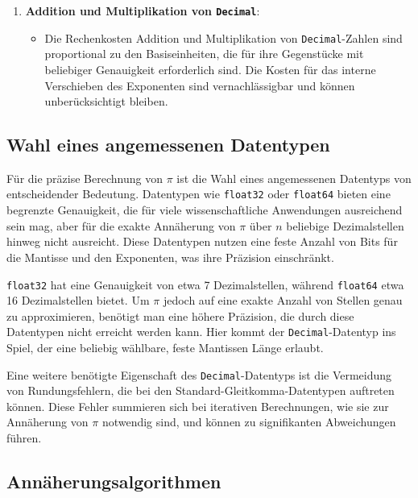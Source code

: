 \documentclass{scrartcl}
\theoremstyle{definition}
\newtheorem{approximation sequence}{Annäherungsfolge}
\begin{document}
\begin{enumerate}
    \item \textbf{Addition und Multiplikation von \texttt{Decimal}}:
          \begin{itemize}
              \item Die Rechenkosten Addition und Multiplikation von
                    \texttt{Decimal}-Zahlen sind proportional zu den
                    Basiseinheiten, die für ihre Gegenstücke mit beliebiger
                    Genauigkeit erforderlich sind. Die Kosten für das interne
                    Verschieben des Exponenten sind vernachlässigbar und können
                    unberücksichtigt bleiben.
          \end{itemize}
\end{enumerate}

\subsection{Wahl eines angemessenen Datentypen}

Für die präzise Berechnung von \(\pi\) ist die Wahl eines angemessenen
Datentyps von entscheidender Bedeutung. Datentypen wie \texttt{float32} oder
\texttt{float64} bieten eine begrenzte Genauigkeit, die für viele
wissenschaftliche Anwendungen ausreichend sein mag, aber für die exakte
Annäherung von \(\pi\) über \(n\) beliebige Dezimalstellen hinweg nicht
ausreicht.
Diese Datentypen nutzen eine feste Anzahl von Bits für die Mantisse und den
Exponenten, was ihre Präzision einschränkt.

\texttt{float32} hat eine Genauigkeit von etwa 7 Dezimalstellen, während
\texttt{float64} etwa 16 Dezimalstellen bietet.
Um \(\pi\) jedoch auf eine exakte Anzahl von Stellen genau zu approximieren,
benötigt man eine höhere Präzision, die durch diese Datentypen nicht erreicht
werden kann.
Hier kommt der \texttt{Decimal}-Datentyp ins Spiel, der eine beliebig wählbare,
feste Mantissen Länge erlaubt.

Eine weitere benötigte Eigenschaft des \texttt{Decimal}-Datentyps ist die
Vermeidung von Rundungsfehlern, die bei den Standard-Gleitkomma-Datentypen
auftreten können. Diese Fehler summieren sich bei iterativen Berechnungen, wie
sie zur Annäherung von \(\pi\) notwendig sind, und können zu signifikanten
Abweichungen führen.

\subsection{Annäherungsalgorithmen}
\end{document}
